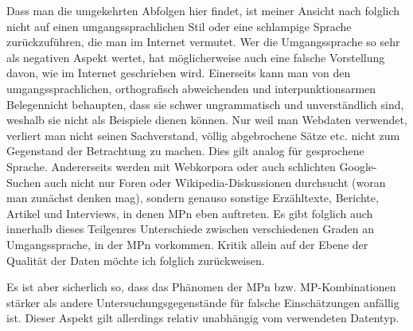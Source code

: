 Dass man die umgekehrten Abfolgen hier findet, ist meiner Ansicht nach folg\-lich nicht auf einen umgangssprachlichen Stil oder eine schlampige Sprache zurückzuführen, die man im Internet vermutet. Wer die Umgangssprache so sehr als negativen Aspekt wertet, hat möglicherweise auch eine falsche Vorstellung davon, wie im Internet geschrieben wird. Einerseits kann man von den umgangs\-sprachlichen, orthografisch abweichenden und interpunktionsarmen Belegen\linebreak nicht behaupten, dass sie schwer ungrammatisch und unverständlich sind, weshalb sie nicht als Beispiele dienen können. Nur weil man Webdaten verwendet, verliert man nicht seinen Sachverstand, völlig abgebrochene Sätze etc. nicht zum Gegenstand der Betrachtung zu machen. Dies gilt analog für gesprochene Sprache. Andererseits werden mit Webkorpora oder auch schlichten Google-Suchen auch nicht nur Foren oder Wikipedia-Diskussionen durchsucht (woran man zunächst denken mag), sondern genauso sonstige Erzähltexte, Berichte, Artikel und Interviews, in denen MPn eben auftreten. Es gibt folglich auch innerhalb dieses Teilgenres Unterschiede zwischen verschiedenen Graden an  Umgangssprache, in der MPn vorkommen. Kritik allein auf der Ebene der Qualität der Daten möchte ich folglich zurückweisen. 

Es ist aber sicherlich so, dass das Phänomen der MPn bzw. MP-Kom\-bi\-na\-ti\-on\-en stärker als andere Untersuchungsgegenstände für falsche Einschätzungen anfällig ist. Dieser Aspekt gilt allerdings relativ unabhängig vom verwendeten Datentyp.

